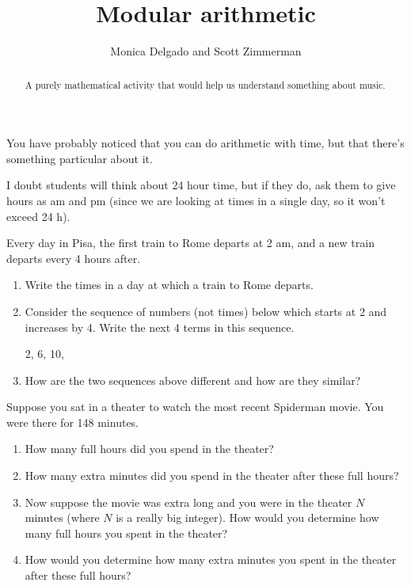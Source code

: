 \documentclass[12pt,noauthor,nooutcomes, instructornotes]{ximera}
\author{Monica Delgado and Scott Zimmerman}
\title{Modular arithmetic}
\begin{document}
\begin{abstract}
  A purely mathematical activity that would help us understand something about music.
\end{abstract}
\maketitle




You have probably noticed that you can do arithmetic with time, but that there's something particular about it.

\begin{instructorNotes}
I doubt students will think about 24 hour time, but if they do, ask them to give hours as am and pm (since we are looking at times in a single day, so it won't exceed 24 h).
\end{instructorNotes}

\begin{question} Every day in Pisa, the first train to Rome departs at 2 am, and a new train departs every 4 hours after. 
\begin{enumerate}
    \item Write the times in a day at which a train to Rome departs.
    \item Consider the sequence of numbers (not times) below which starts at 2 and increases by 4. Write the next 4 terms in this sequence.
    
    2, 6, 10,
    
    \item How are the two sequences above different and how are they similar?
\end{enumerate}
\end{question}


\begin{question}
Suppose you sat in a theater to watch the most recent Spiderman movie. You were there for 148 minutes.
\begin{enumerate}
    \item How many full hours did you spend in the theater?
    \item How many extra minutes did you spend in the theater after these full hours?
    
    \item Now suppose the movie was extra long and you were in the theater $N$ minutes (where $N$ is a really big integer). How would you determine how many full hours you spent in the theater?
    
    \item How would you determine how many extra minutes you spent in the theater after these full hours?
\end{enumerate}
\end{question}
\end{document}
